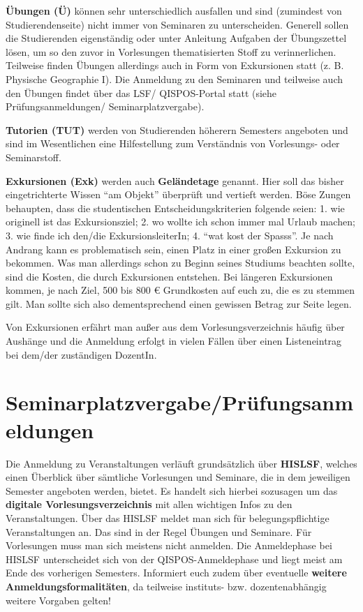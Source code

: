 \textbf{Übungen (Ü)} können sehr unterschiedlich ausfallen und sind (zumindest von Studierendenseite) nicht immer von Seminaren zu unterscheiden. Generell sollen die Studierenden eigenständig oder unter Anleitung Aufgaben der Übungszettel lösen, um so den zuvor in Vorlesungen thematisierten Stoff zu verinnerlichen. Teilweise finden Übungen allerdings auch in Form von Exkursionen statt (z. B. Physische Geographie I). Die Anmeldung zu den Seminaren und teilweise auch den Übungen findet über das LSF/ QISPOS-Portal statt (siehe Prüfungsanmeldungen/ Seminarplatzvergabe).

\textbf{Tutorien (TUT)} werden von Studierenden höherern Semesters angeboten und sind im Wesentlichen eine Hilfestellung zum Verständnis von Vorlesungs- oder Seminarstoff.

\textbf{Exkursionen (Exk)} werden auch \textbf{Geländetage} genannt. Hier soll das bisher eingetrichterte Wissen \enquote{am Objekt} überprüft und vertieft werden. Böse Zungen behaupten, dass die studentischen Entscheidungskriterien folgende seien: 1. wie originell ist das Exkursionsziel; 2. wo wollte ich schon immer mal Urlaub machen; 3. wie finde ich den/die ExkursionsleiterIn; 4. \enquote{wat kost der Spasss}. Je nach Andrang kann es problematisch sein, einen Platz in einer großen Exkursion zu bekommen. Was man allerdings schon zu Beginn seines Studiums beachten sollte, sind die Kosten, die durch Exkursionen entstehen. Bei längeren Exkursionen kommen, je nach Ziel, 500 bis 800 € Grundkosten auf euch zu, die es zu stemmen gilt. Man sollte sich also dementsprechend einen gewissen Betrag zur Seite legen.

Von Exkursionen erfährt man außer aus dem Vorlesungsverzeichnis häufig über Aushänge und die Anmeldung erfolgt in vielen Fällen über einen Listeneintrag bei dem/der zuständigen DozentIn.

\section{Seminarplatzvergabe/Prüfungsanmeldungen}

Die Anmeldung zu Veranstaltungen verläuft grundsätzlich über \textbf{HISLSF}, welches einen Überblick über sämtliche Vorlesungen und Seminare, die in dem jeweiligen Semester angeboten werden, bietet. Es handelt sich hierbei sozusagen um das \textbf{digitale Vorlesungsverzeichnis} mit allen wichtigen Infos zu den Veranstaltungen. Über das HISLSF meldet man sich für belegungspflichtige Veranstaltungen an. Das sind in der Regel Übungen und Seminare. Für Vorlesungen muss man sich meistens nicht anmelden. Die Anmeldephase bei HISLSF unterscheidet sich von der QISPOS-Anmeldephase und liegt meist am Ende des vorherigen Semesters. Informiert euch zudem über eventuelle \textbf{weitere Anmeldungsformalitäten}, da teilweise instituts- bzw. dozentenabhängig weitere Vorgaben gelten!

